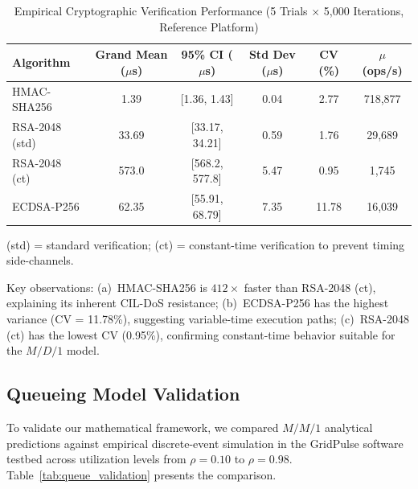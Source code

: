 \documentclass[journal]{IEEEtran}
\begin{document}
\begin{table}[t]
\caption{Empirical Cryptographic Verification Performance (5 Trials $\times$ 5,000 Iterations, Reference Platform)}
\label{tab:crypto_bench}
\centering
\begin{tabular}{lccccc}
\toprule
\textbf{Algorithm} & \textbf{Grand Mean ($\mu$s)} & \textbf{95\% CI ($\mu$s)} & \textbf{Std Dev ($\mu$s)} & \textbf{CV (\%)} & \textbf{$\mu$ (ops/s)} \\
\midrule
HMAC-SHA256 & 1.39 & [1.36, 1.43] & 0.04 & 2.77 & 718,877 \\
RSA-2048 (std)   & 33.69 & [33.17, 34.21] & 0.59 & 1.76 & 29,689 \\
RSA-2048 (ct)    & 573.0 & [568.2, 577.8] & 5.47 & 0.95 & 1,745 \\
ECDSA-P256  & 62.35 & [55.91, 68.79] & 7.35 & 11.78 & 16,039 \\
\bottomrule
\end{tabular}
\vspace{1mm}
\small{(std) = standard verification; (ct) = constant-time verification to prevent timing side-channels.}
\end{table}

Key observations: (a)~HMAC-SHA256 is $412\times$ faster than RSA-2048 (ct), explaining its inherent CIL-DoS resistance; (b)~ECDSA-P256 has the highest variance (CV = 11.78\%), suggesting variable-time execution paths; (c)~RSA-2048 (ct) has the lowest CV (0.95\%), confirming constant-time behavior suitable for the $M/D/1$ model.

\subsection{Queueing Model Validation}
To validate our mathematical framework, we compared $M/M/1$ analytical predictions against empirical discrete-event simulation in the GridPulse software testbed across utilization levels from $\rho = 0.10$ to $\rho = 0.98$. Table~\ref{tab:queue_validation} presents the comparison.
\end{document}
